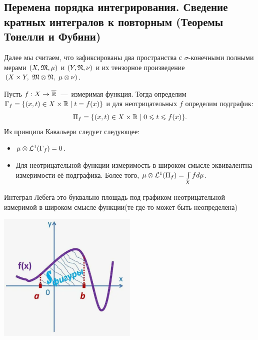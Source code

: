 \subsection{Перемена порядка интегрирования. Сведение кратных интегралов к повторным (Теоремы Тонелли и Фубини)}
Далее мы считаем, что зафиксированы два пространства с $\sigma$-конечными полными мерами $(X, \mathfrak{M}, \mu)$ и $(Y, \mathfrak{N}, \nu)$ и их тензорное произведение $(X \times Y, \ \mathfrak{M} \otimes \mathfrak{N}, \ \mu \otimes \nu)$.
\begin{corollary}
    Пусть $f: X \rightarrow \overline{\mathbb{R}}$~---~измеримая функция. Тогда определим $\Gamma_f = \{(x, t) \in X \times \mathbb{R} \mid t = f(x) \}$ и для неотрицательных $f$ определим подграфик: $$\Pi_f = \{(x, t) \in X \times \mathbb{R} \mid 0 \leqslant t \leqslant f(x) \}.$$ Из принципа Кавальери следует следующее:
    \begin{itemize}
        \item $\mu \otimes \mathcal{L}^1(\Gamma_f) = 0$.
        \item Для неотрицательной функции измеримость в широком смысле эквивалентна измеримости её подграфика. Более того, $\mu \otimes \mathcal{L}^1(\Pi_f) = \int\limits_X fd\mu$.
    \end{itemize}

\begin{minipage}{0.5\textwidth}\raggedleft
Интеграл Лебега это буквально площадь под графиком неотрицательной измеримой в широком смысле функции(те где-то может быть неопределена)
\end{minipage}    
\begin{minipage}{0.5\textwidth}%
    \includegraphics[width=0.5\textwidth]{images/Integral.png} 
\end{minipage}%

\end{corollary}
\hfill%

